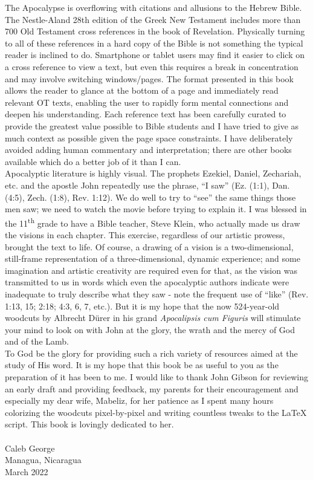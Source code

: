 The Apocalypse is overflowing with citations and allusions to the Hebrew Bible. The Nestle-Aland 28th edition of the Greek New Testament includes more than 700 Old Testament cross references in the book of Revelation. Physically turning to all of these references in a hard copy of the Bible is not something the typical reader is inclined to do. Smartphone or tablet users may find it easier to click on a cross reference to view a text, but even this requires a break in concentration and may involve switching windows/pages. The format presented in this book allows the reader to glance at the bottom of a page and immediately read relevant OT texts, enabling the user to rapidly form mental connections and deepen his understanding. Each reference text has been carefully curated to provide the greatest value possible to Bible students and I have tried to give as much context as possible given the page space constraints. I have deliberately avoided adding human commentary and interpretation; there are other books available which do a better job of it than I can.\\

Apocalyptic literature is highly visual. The prophets Ezekiel, Daniel, Zechariah, etc. and the apostle John repeatedly use the phrase, ``I saw'' (Ez. (1:1), Dan. (4:5), Zech. (1:8), Rev. 1:12). We do well to try to ``see'' the same things those men saw; we need to watch the movie before trying to explain it. I was blessed in the 11\textsuperscript{th} grade to have a Bible teacher, Steve Klein, who actually made us draw the visions in each chapter. This exercise, regardless of our artistic prowess, brought the text to life. Of course, a drawing of a vision is a two-dimensional, still-frame representation of a three-dimensional, dynamic experience; and some imagination and artistic creativity are required even for that, as the vision was transmitted to us in words which even the apocalyptic authors indicate were inadequate to truly describe what they saw - note the frequent use of ``like'' (Rev. 1:13, 15; 2:18; 4:3, 6, 7, etc.). But it is my hope that the now 524-year-old woodcuts by Albrecht Dürer in his grand \textit{Apocalipsis cum Figuris} will stimulate your mind to look on with John at the glory, the wrath and the mercy of God and of the Lamb.\\

To God be the glory for providing such a rich variety of resources aimed at the study of His word. It is my hope that this book be as useful to you as the preparation of it has been to me. I would like to thank John Gibson for reviewing an early draft and providing feedback, my parents for their encouragement and especially my dear wife, Mabeliz, for her patience as I spent many hours colorizing the woodcuts pixel-by-pixel and writing countless tweaks to the \LaTeX{} script. This book is lovingly dedicated to her.\\
\\
Caleb George\\
Managua, Nicaragua\\
March 2022
\clearpage

